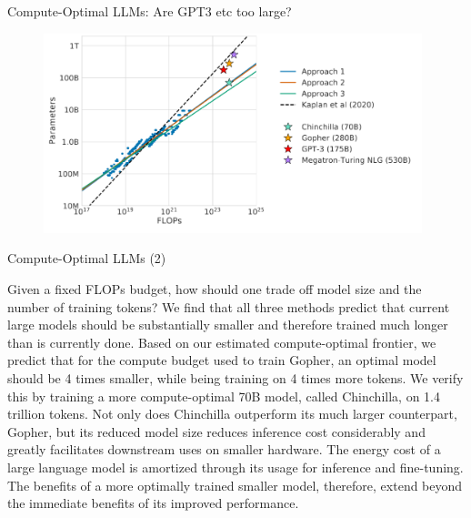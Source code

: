 
\begin{vbframe}{Compute-Optimal LLM\MakeLowercase{s}: Are GPT3 etc too large?}

\vfill

\begin{figure}
	\centering
	\includegraphics[width = 11cm]{./figure/chinchilla.png} \\ 
\end{figure}

\vfill

\end{vbframe}


\begin{vbframe}{Compute-Optimal LLM\MakeLowercase{s} (2)}

Given a fixed FLOPs budget, how should one trade off model size and
the number of training tokens? We find that all three methods predict
that current large models should be substantially smaller and therefore
trained much longer than is currently done. Based on our estimated
compute-optimal frontier, we predict that for the compute budget used
to train Gopher, an optimal model should be 4 times smaller, while
being training on 4 times more tokens. We verify this by training a more
compute-optimal 70B model, called Chinchilla, on 1.4 trillion tokens.
Not only does Chinchilla outperform its much larger counterpart,
Gopher, but its reduced model size reduces inference cost considerably
and greatly facilitates downstream uses on smaller hardware. The
energy cost of a large language model is amortized through its usage
for inference and fine-tuning. The benefits of a more optimally trained
smaller model, therefore, extend beyond the immediate benefits of its
improved performance.

\end{vbframe}

